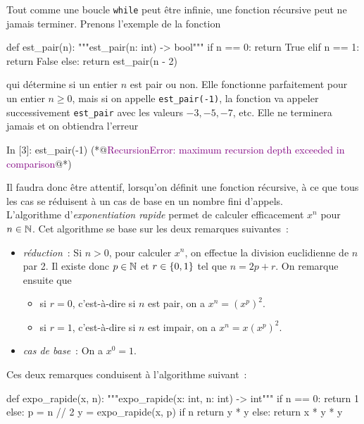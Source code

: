 \documentclass{magnolia}
\begin{document}
\vspace{2ex}
Tout comme une boucle \verb!while! peut être infinie, une fonction récursive peut
ne jamais terminer. Prenons l'exemple de la fonction
\begin{pythoncodeline}
def est_pair(n):
    """est_pair(n: int) -> bool"""
    if n == 0:
        return True
    elif n == 1:
        return False
    else:
        return est_pair(n - 2)
\end{pythoncodeline}
\noindent
qui détermine si un entier $n$ est pair ou non. Elle fonctionne parfaitement pour
un entier $n\geq 0$, mais si on appelle \verb!est_pair(-1)!, la fonction
va appeler successivement \verb!est_pair! avec les valeurs $-3,-5,-7$, etc. Elle
ne terminera jamais et on obtiendra l'erreur
\begin{pythoncode}
In [3]: est_pair(-1)
(*@\textcolor{purple}{RecursionError: maximum recursion depth exceeded in comparison}@*)
\end{pythoncode}
Il faudra donc être attentif, lorsqu'on définit une fonction récursive, à ce que
tous les cas se réduisent à un cas de base en un nombre fini d'appels.\\


L'algorithme d'\emph{exponentiation rapide} permet de calculer efficacement $x^n$ pour $n\in\mathbb{N}$. Cet
algorithme se base sur les deux remarques suivantes~:
\begin{itemize}
\item \emph{réduction}~: Si $n>0$, pour calculer $x^n$, on effectue la division
  euclidienne de $n$ par 2. Il existe donc $p\in\mathbb{N}$ et $r\in\left\{0,1\right\}$ tel que $n=2p+r$.
  On remarque ensuite que
\begin{itemize}
\item si $r=0$, c'est-à-dire si $n$ est pair, on a $x^n=(x^p)^2$.
\item si $r=1$, c'est-à-dire si $n$ est impair, on a $x^n=x(x^p)^2$. 
\end{itemize}
\item \emph{cas de base}~: On a $x^0=1$.
\end{itemize}
Ces deux remarques conduisent à l'algorithme suivant~:
\begin{pythoncodeline}
def expo_rapide(x, n):
    """expo_rapide(x: int, n: int) -> int"""
    if n == 0:
        return 1
    else:
        p = n // 2
        y = expo_rapide(x, p)
        if n %
            return y * y
        else:
            return x * y * y
\end{pythoncodeline}
\end{document}
